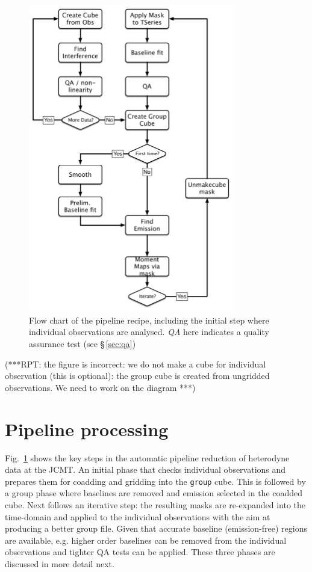 \documentclass[final,authoryear,5p,times,twocolumn]{elsarticle}
\begin{document}
\begin{figure}
\includegraphics[width=90mm]{flowchart}
\caption{Flow chart of the pipeline recipe, including the initial step
  where individual observations are analysed. \emph{QA} here indicates
a quality assurance test (see \S\,\ref{sec:qa})}
\label{fig:flowchart}
\end{figure}

{\color{red}(***RPT: the figure is incorrect: we do not make a cube for individual observation
 (this is optional): the group cube is created from ungridded observations.
  We need to work on the diagram  ***)}

\section{Pipeline processing}

Fig.\ \ref{fig:flowchart} shows the key steps in the automatic
pipeline reduction of heterodyne data at the JCMT. An initial phase
that checks individual observations and prepares them for coadding and
gridding into the \texttt{group} cube. This is followed by a group
phase where baselines are removed and emission selected in the coadded
cube.  Next follows an iterative step: the resulting masks are
re-expanded into the time-domain and applied to the individual
observations with the aim at producing a better group file. Given that
accurate baseline (emission-free) regions are available, e.g. higher
order baselines can be removed from the individual observations and
tighter QA tests can be applied. These three phases are discussed in
more detail next.
\end{document}
